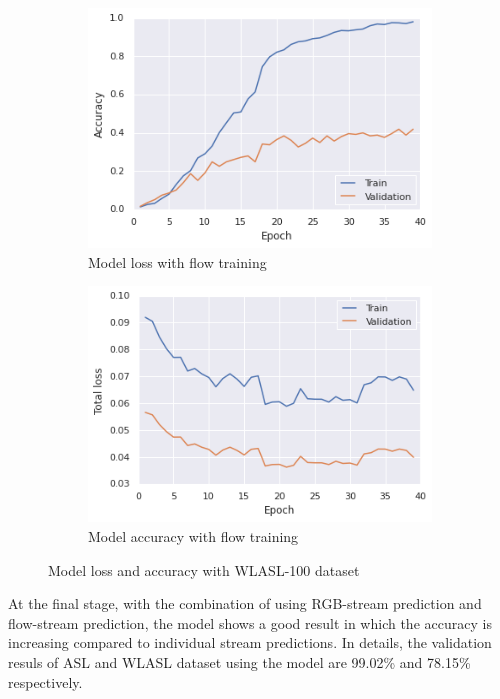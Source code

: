 \documentclass[a4paper, 12pt]{article}
\begin{document}
\begin{figure}[H]
    \centering
    \begin{subfigure}[b]{0.4\textwidth}
        \includegraphics[width=\textwidth]{result_wlasl_100_flow_acc.png}
        \caption{Model loss with flow training             }
    \end{subfigure}
    \hfill
    \begin{subfigure}[b]{0.4\textwidth}
        \includegraphics[width=\textwidth]{result_wlasl_100_flow_loss.png}
        \caption{Model accuracy with flow training}
    \end{subfigure}
    \caption{Model loss and accuracy with WLASL-100 dataset}
    \label{Model training WLASL dataset, flow-stream}
\end{figure}

At the final stage, with the combination of using RGB-stream prediction and flow-stream prediction, the model shows a good result in which the accuracy is increasing compared to individual stream predictions. In details, the validation resuls of ASL and WLASL dataset using the model are 99.02\% and 78.15\% respectively.
\newpage
\end{document}
